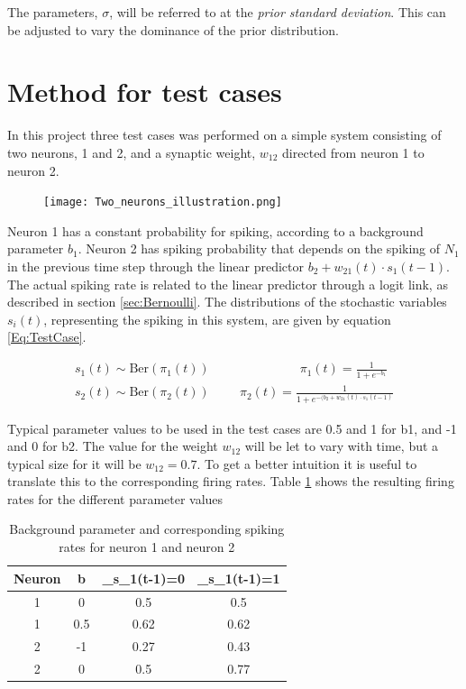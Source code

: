 The parameters, $\sigma$, will be referred to at the \textit{prior standard deviation}. This can be adjusted to vary the dominance of the prior distribution. 


\section{Method for test cases}
\label{Method}

In this project three test cases was performed on a simple system consisting of two neurons, 1 and 2, and a synaptic weight, $w_{12}$ directed from neuron 1 to neuron 2.

\begin{figure}[h]
    \centering
    \texttt{[image: Two\_neurons\_illustration.png]}
\end{figure}

Neuron 1 has a constant probability for spiking, according to a background parameter $b_1$. Neuron 2 has spiking probability that depends on the spiking of $N_1$ in the previous time step through the linear predictor $b_2 + w_{21}(t) \cdot s_{1}(t-1)$. The actual spiking rate is related to the linear predictor through a logit link, as described in section \ref{sec:Bernoulli}. The distributions of the stochastic variables $s_{i}(t)$, representing the spiking in this system, are given by equation \ref{Eq:TestCase}.

\begin{equation}
\begin{split}
\label{Eq:TestCase}
    s_{1}(t) \sim \text{Ber}(\pi_{1}(t)) \hspace{3cm} \pi_{1}(t)= \frac{1}{1+e^{-b_1}} \\
    s_{2}(t) \sim \text{Ber}(\pi_{2}(t)) \hspace{1cm} \pi_{2}(t)= \frac{1}{1+e^{-(b_2 + w_{21}(t) \cdot s_{1}(t-1)}}
\end{split}
\end{equation}

Typical parameter values to be used in the test cases are 0.5 and 1 for b1, and -1 and 0 for b2. The value for the weight $w_{12}$ will be let to vary with time, but a typical size for it will be $w_{12}=0.7$. To get a better intuition it is useful to translate this to the corresponding firing rates. Table \ref{table:parameters} shows the resulting firing rates for the different parameter values


\begin{table}[!h]
\centering
\begin{tabular}{|c|c|c|c|}
	\hline
	Neuron & b & \pi_{s_{1}(t-1)=0} & \pi_{s_{1}(t-1)=1} \\
	\hline\hline
	1 & 0 & 0.5 & 0.5\\
	\hline
	1 & 0.5 & 0.62 & 0.62\\
	\hline
	2 & -1  & 0.27 & 0.43\\
	\hline
	2 & 0  & 0.5 & 0.77\\
	\hline
\end{tabular}
\caption{Background parameter and corresponding spiking rates for neuron 1 and neuron 2}
\label{table:parameters}
\end{table}

